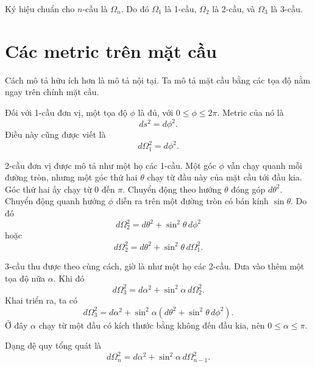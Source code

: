 Ký hiệu chuẩn cho \(n\)-cầu là \(\Omega_n\). Do đó \(\Omega_1\) là 1-cầu, \(\Omega_2\) là 2-cầu, và \(\Omega_3\) là 3-cầu.

\section{Các metric trên mặt cầu}

Cách mô tả hữu ích hơn là mô tả nội tại. Ta mô tả mặt cầu bằng các tọa độ nằm ngay trên chính mặt cầu.

Đối với 1-cầu đơn vị, một tọa độ \(\phi\) là đủ, với \(0\leq \phi \leq 2\pi\). Metric của nó là
\begin{equation}
ds^2=d\phi^2.
\end{equation}
Điều này cũng được viết là
\begin{equation}
d\Omega_1^2=d\phi^2.
\end{equation}

2-cầu đơn vị được mô tả như một họ các 1-cầu. Một góc \(\phi\) vẫn chạy quanh mỗi đường tròn, nhưng một góc thứ hai \(\theta\) chạy từ đầu này của mặt cầu tới đầu kia. Góc thứ hai ấy chạy từ \(0\) đến \(\pi\). Chuyển động theo hướng \(\theta\) đóng góp \(d\theta^2\). Chuyển động quanh hướng \(\phi\) diễn ra trên một đường tròn có bán kính \(\sin\theta\). Do đó
\begin{equation}
d\Omega_2^2=d\theta^2+\sin^2\theta\,d\phi^2
\end{equation}
hoặc
\begin{equation}
d\Omega_2^2=d\theta^2+\sin^2\theta\,d\Omega_1^2.
\end{equation}

3-cầu thu được theo cùng cách, giờ là như một họ các 2-cầu. Đưa vào thêm một tọa độ nữa \(\alpha\). Khi đó
\begin{equation}
d\Omega_3^2=d\alpha^2+\sin^2\alpha\,d\Omega_2^2.
\end{equation}
Khai triển ra, ta có
\begin{equation}
d\Omega_3^2=d\alpha^2+\sin^2\alpha\left(d\theta^2+\sin^2\theta\,d\phi^2\right).
\end{equation}
Ở đây \(\alpha\) chạy từ một đầu có kích thước bằng không đến đầu kia, nên \(0\leq \alpha \leq \pi\).

Dạng đệ quy tổng quát là
\begin{equation}
d\Omega_n^2=d\alpha^2+\sin^2\alpha\,d\Omega_{n-1}^2.
\end{equation}

